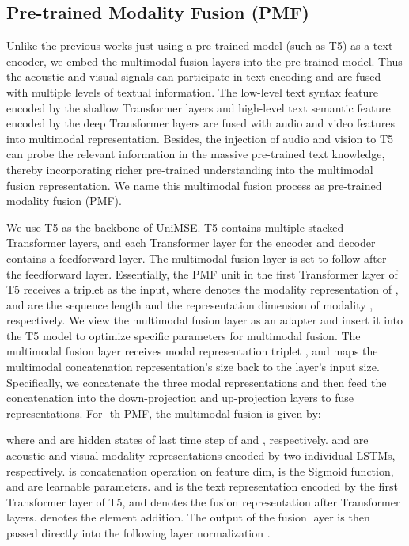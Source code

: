 \documentclass[11pt]{article}
\begin{document}
\subsection{Pre-trained Modality Fusion (PMF)}
Unlike the previous works just using a pre-trained model (such as T5) as a text encoder, we embed the multimodal fusion layers into the pre-trained model. Thus the acoustic and visual signals can participate in text encoding and are fused with multiple levels of textual information. The low-level text syntax feature encoded by the shallow Transformer layers and high-level text semantic feature encoded by the deep Transformer layers \cite{DBLP:conf/naacl/PetersNIGCLZ18,DBLP:conf/nips/VaswaniSPUJGKP17} are fused with audio and video features into multimodal representation. Besides, the injection of audio and vision to T5 can probe the relevant information in the massive pre-trained text knowledge, thereby incorporating richer pre-trained understanding into the multimodal fusion representation. We name this multimodal fusion process as pre-trained modality fusion (PMF).

We use T5 as the backbone of UniMSE. T5 contains multiple stacked Transformer layers, and each Transformer layer for the encoder and decoder contains a feedforward layer. The multimodal fusion layer is set to follow after the feedforward layer. Essentially, the PMF unit in the first Transformer layer of T5 receives a triplet  as the input, where  denotes the modality representation of ,  and  are the sequence length and the representation dimension of modality , respectively. We view the multimodal fusion layer as an adapter \citep{DBLP:conf/icml/HoulsbyGJMLGAG19} and insert it into the T5 model to optimize specific parameters for multimodal fusion. The multimodal fusion layer receives modal representation triplet , and maps the multimodal concatenation representation's size back to the layer’s input size. Specifically, we concatenate the three modal representations and then feed the concatenation into the down-projection and up-projection layers to fuse representations. For -th PMF, the multimodal fusion is given by: 

where  and  are hidden states of last time step of  and , respectively.
 and  are acoustic and visual modality representations encoded by two individual LSTMs, respectively.
 is concatenation operation on feature dim,  is the Sigmoid function, and  are learnable parameters.  and  is the text representation encoded by the first Transformer layer of T5, and  denotes the fusion representation after  Transformer layers.  denotes the element addition. The output of the fusion layer is then passed directly into the following layer normalization \cite{DBLP:journals/corr/BaKH16}.
\end{document}

